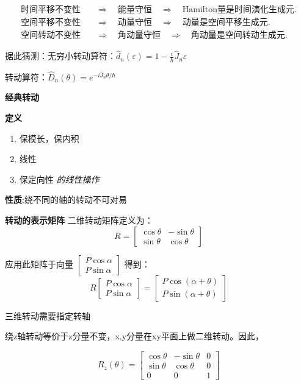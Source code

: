 \documentclass[lang=cn,10pt]{elegantbook}
\begin{document}
\begin{align*}
	\text{时间平移不变性} &\quad \Longrightarrow \quad \text{能量守恒} \quad \Longrightarrow \quad \text{Hamilton量是时间演化生成元}. \\
	\text{空间平移不变性} &\quad \Longrightarrow \quad \text{动量守恒} \quad \Longrightarrow \quad \text{动量是空间平移生成元}. \\
	\text{空间转动不变性} &\quad \Longrightarrow \quad \text{角动量守恒} \quad \Longrightarrow \quad \text{角动量是空间转动生成元}.
\end{align*}

据此猜测：无穷小转动算符：\(\hat{d}_n(\varepsilon) = 1 - \frac{i}{\hbar} \hat{J}_n \varepsilon\)

转动算符：\(\hat{D}_n(\theta) = e^{-i \hat{J}_n \theta/\hbar}\)


\textbf{经典转动}

\textbf{定义}
\begin{enumerate}
	\item 保模长，保内积
	\item 线性
	\item 保定向性 \quad \textit{的线性操作}
\end{enumerate}

\textbf{性质}:绕不同的轴的转动不可对易

\textbf{转动的表示矩阵}
二维转动矩阵定义为：
\[
R = \begin{bmatrix}
	\cos\theta & -\sin\theta \\
	\sin\theta & \cos\theta
\end{bmatrix}
\]

应用此矩阵于向量 \(\begin{bmatrix} P\cos\alpha \\ P\sin\alpha \end{bmatrix}\) 得到：
\[
R \begin{bmatrix} P\cos\alpha \\ P\sin\alpha \end{bmatrix} = \begin{bmatrix} P\cos(\alpha+\theta) \\ P\sin(\alpha+\theta) \end{bmatrix}
\]

三维转动需要指定转轴

绕z轴转动等价于z分量不变，x,y分量在xy平面上做二维转动。因此，

\[
R_z(\theta) = \begin{bmatrix}
	\cos\theta & -\sin\theta & 0 \\
	\sin\theta & \cos\theta & 0 \\
	0 & 0 & 1
\end{bmatrix}
\]
\end{document}
